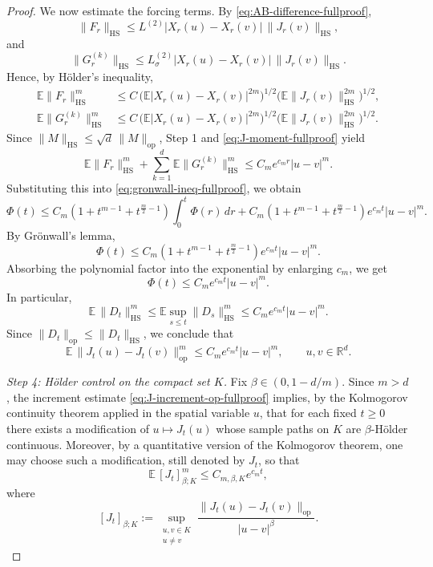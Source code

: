 \documentclass{tsp-short}
\theoremstyle{remark}
\theoremstyle{definition}
\begin{document}
\begin{proof}
We now estimate the forcing terms. By \eqref{eq:AB-difference-fullproof},
\[
\|F_r\|_{\mathrm{HS}}
\le
L^{(2)}|X_r(u)-X_r(v)|\,\|J_r(v)\|_{\mathrm{HS}},
\]
and
\[
\|G_r^{(k)}\|_{\mathrm{HS}}
\le
L_\sigma^{(2)}|X_r(u)-X_r(v)|\,\|J_r(v)\|_{\mathrm{HS}}.
\]
Hence, by Hölder's inequality,
\begin{align*}
\mathbb{E}\|F_r\|_{\mathrm{HS}}^m
&\le
C\,
\Big(\mathbb{E}|X_r(u)-X_r(v)|^{2m}\Big)^{1/2}
\Big(\mathbb{E}\|J_r(v)\|_{\mathrm{HS}}^{2m}\Big)^{1/2}, \\
\mathbb{E}\|G_r^{(k)}\|_{\mathrm{HS}}^m
&\le
C\,
\Big(\mathbb{E}|X_r(u)-X_r(v)|^{2m}\Big)^{1/2}
\Big(\mathbb{E}\|J_r(v)\|_{\mathrm{HS}}^{2m}\Big)^{1/2}.
\end{align*}
Since \(\|M\|_{\mathrm{HS}}\le \sqrt d\,\|M\|_{\mathrm{op}}\), Step 1 and \eqref{eq:J-moment-fullproof} yield
\[
\mathbb{E}\|F_r\|_{\mathrm{HS}}^m
+
\sum_{k=1}^d \mathbb{E}\|G_r^{(k)}\|_{\mathrm{HS}}^m
\le
C_m e^{c_m r}|u-v|^m.
\]
Substituting this into \eqref{eq:gronwall-ineq-fullproof}, we obtain
\[
\Phi(t)
\le
C_m(1+t^{m-1}+t^{\frac m2-1})\int_0^t \Phi(r)\,dr
+
C_m(1+t^{m-1}+t^{\frac m2-1})e^{c_m t}|u-v|^m.
\]
By Grönwall's lemma,
\[
\Phi(t)
\le
C_m(1+t^{m-1}+t^{\frac m2-1})e^{c_m t}|u-v|^m.
\]
Absorbing the polynomial factor into the exponential by enlarging \(c_m\), we get
\[
\Phi(t)\le C_m e^{c_m t}|u-v|^m.
\]
In particular,
\[
\mathbb{E}\,\|D_t\|_{\mathrm{HS}}^m
\le
\mathbb{E}\sup_{s\le t}\|D_s\|_{\mathrm{HS}}^m
\le
C_m e^{c_m t}|u-v|^m.
\]
Since \(\|D_t\|_{\mathrm{op}}\le \|D_t\|_{\mathrm{HS}}\), we conclude that
\begin{equation}\label{eq:J-increment-op-fullproof}
\mathbb{E}\,\|J_t(u)-J_t(v)\|_{\mathrm{op}}^m
\le
C_m e^{c_m t}|u-v|^m,
\qquad u,v\in\mathbb{R}^d.
\end{equation}





\smallskip
\noindent\emph{Step 4: Hölder control on the compact set \(K\).}
Fix \(\beta\in(0,1-d/m)\).
Since \(m>d\), the increment estimate \eqref{eq:J-increment-op-fullproof} implies, by the Kolmogorov continuity theorem applied in the spatial variable \(u\), that for each fixed \(t\ge0\) there exists a modification of \(u\mapsto J_t(u)\) whose sample paths on \(K\) are \(\beta\)-H\"older continuous.
Moreover, by a quantitative version of the Kolmogorov theorem, one may choose such a modification, still denoted by \(J_t\), so that
\begin{equation}\label{eq:holder-bound-fullproof}
\mathbb{E}\,[J_t]_{\beta;K}^m
\le
C_{m,\beta,K}e^{c_m t},
\end{equation}
where
\[
[J_t]_{\beta;K}
:=
\sup_{\substack{u,v\in K\\u\neq v}}
\frac{\|J_t(u)-J_t(v)\|_{\mathrm{op}}}{|u-v|^\beta}.
\]




\end{proof}
\end{document}
